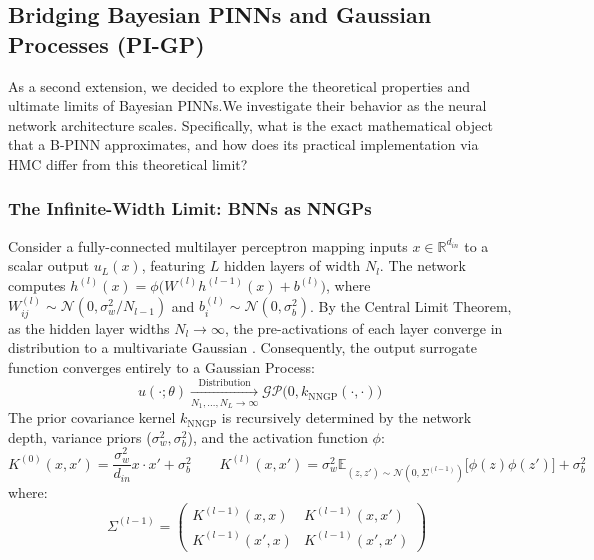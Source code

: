 \documentclass{article}
\begin{document}
\subsection{Bridging Bayesian PINNs and Gaussian Processes (PI-GP)}
As a second extension, we decided to explore the theoretical properties and ultimate limits of Bayesian PINNs.We investigate their behavior as the neural network architecture scales. Specifically, what is the exact mathematical object that a B-PINN approximates, and how does its practical implementation via HMC differ from this theoretical limit?

\subsubsection{The Infinite-Width Limit: BNNs as NNGPs}

Consider a fully-connected multilayer perceptron mapping inputs $x \in \mathbb{R}^{d_{in}}$ to a scalar output $u_L(x)$, featuring $L$ hidden layers of width $N_l$. The network computes $h^{(l)}(x) = \phi\big(W^{(l)} h^{(l-1)}(x) + b^{(l)}\big)$, where $W^{(l)}_{ij} \sim \mathcal{N}(0, \sigma_w^2 / N_{l-1})$ and $b^{(l)}_i \sim \mathcal{N}(0, \sigma_b^2)$.
By the Central Limit Theorem, as the hidden layer widths $N_l \to \infty$, the pre-activations of each layer converge in distribution to a multivariate Gaussian \cite{Lee2018}. Consequently, the output surrogate function converges entirely to a Gaussian Process:
\begin{equation*}
u(\cdot;\theta) \xrightarrow[N_1, \dots, N_L \to \infty]{\text{Distribution}} \mathcal{GP}\big(0, k_{\text{NNGP}}(\cdot, \cdot)\big)
\end{equation*}
The prior covariance kernel $k_{\text{NNGP}}$ is recursively determined by the network depth, variance priors ($\sigma_w^2, \sigma_b^2$), and the activation function $\phi$:
\begin{equation*}
K^{(0)}(x, x') = \frac{\sigma_w^2}{d_{in}} x \cdot x' + \sigma_b^2 \quad \quad K^{(l)}(x, x') = \sigma_w^2 \mathbb{E}_{(z, z') \sim \mathcal{N}(0, \Sigma^{(l-1)})} \Big[ \phi(z) \phi(z') \Big] + \sigma_b^2
\end{equation*}
where: 
\begin{equation*}
\quad \Sigma^{(l-1)} = \begin{pmatrix} K^{(l-1)}(x, x) & K^{(l-1)}(x, x') \\ K^{(l-1)}(x', x) & K^{(l-1)}(x', x') \end{pmatrix}
\end{equation*}
\end{document}
